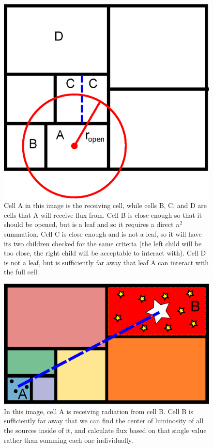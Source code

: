 \begin{figure}
\includegraphics[width=\textwidth]{graphics/opening_angles2.eps}
\caption[The opening angle criteria.]{Cell A in this image is the receiving cell, while cells B, C, and D are cells that A will receive flux from. Cell B is close enough so that it should be opened, but is a leaf and so it requires a direct $n^2$ summation. Cell C is close enough and is not a leaf, so it will have its two children checked for the same criteria (the left child will be too close, the right child will be acceptable to interact with). Cell D is not a leaf, but is sufficiently far away that leaf A can interact with the full cell.}
\label{fig:openinganglecriteria}
\end{figure}

\begin{figure}
\includegraphics[width=\textwidth]{graphics/flux.eps}
\caption[The exchange of radiation.]{In this image, cell A is receiving radiation from cell B. Cell B is sufficiently far away that we can find the center of luminosity of all the sources inside of it, and calculate flux based on that single value rather than summing each one individually.}
\label{fig:radexchange}
\end{figure}

